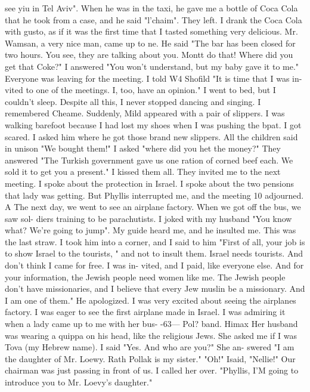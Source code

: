 see yiu in Tel Aviv".
When he was in the taxi, he gave me a bottle of Coca Cola that he 
took from a case, and he said "l'chaim".
They left.
I drank the Coca Cola with gusto, as 
if it was the first time that I tasted something very delicious.
Mr.
Wamsan, a very nice 
man, came up to ne.
He said "The bar has been closed for two hours.
You see, they are 
talking about you.
Montt do that!
Where did you get that Coke?"
I answered "You won't 
understand, but my baby gave it to me."
Everyone was leaving for the meeting.
I told W4 Shofild "It is time that I was in-
vited to one of the meetings.
I, too, have an opinion."
I went to bed, but I couldn't 
sleep.
Despite all this, I never stopped dancing and singing.
I remembered Cheame.
Suddenly, Mild appeared with a pair of slippers.
I was walking barefoot because I 
had lost my shoes when I was pushing the bpat.
I got scared.
I asked him where he got 
those brand new slippers.
All the children said in unison "We bought them!"
I asked 
"where did you het the money?"
They answered "The Turkish government gave us one ration of 
% 
corned beef each.
We sold it to get you a present."
I kissed them all.
They invited me to the next meeting.
I spoke about the protection in Israel.
I spoke 
about the two pensions that lady was getting.
But Phyllis interrupted me, and the meeting 10 
adjourned.
A 
The next day, we went to see an airplane factory.
When we got off the bus, we saw sol-
diers training to be parachutists.
I joked with my husband "You know what?
We're going 
to jump".
My guide heard me, and he insulted me.
This was the last straw.
I took him 
into a corner, and I said to him "First of all, your job is to show Israel to the tourists, " 
and not to insult them.
Israel needs tourists.
And don't think I came for free.
I was in-
vited, and I paid, like everyone else.
And for your information, the Jewish people need 
women like me.
The Jewish people don't have missionaries, and I believe that every Jew muslin 
be a missionary.
And I am one of them."
He apologized.
I was very excited about seeing the airplanes factory.
I was eager to see the first 
airplane made in Israel.
I was admiring it when a lady came up to me with her bus-
-63— 
Pol?
band.
Himax Her husband was wearing a quippa on his head, like the religious Jews.
She asked me if I was Tova (my Hebrew name).
I said "Yes.
And who are you?"
She an-
swered "I am the daughter of Mr.
Loewy.
Rath Pollak is my sister."
"Oh!"
Isaid, "Nellie!"
Our chairman was just passing in front of us.
I called her over.
"Phyllis, I'M going to 
introduce you to Mr.
Loevy's daughter."

